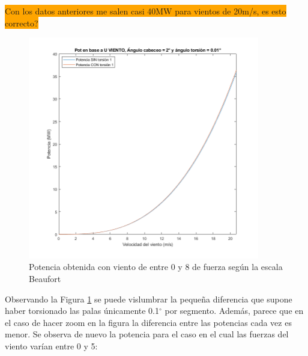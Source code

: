 \colorbox{orange}{Con los datos anteriores me salen casi 40MW para vientos de 20m/s, es esto correcto?}
\begin{figure}[H]
    \centering
    \includegraphics[width=0.9\textwidth]{images/0-8beau torsion.png}
    \caption{Potencia obtenida con viento de entre 0 y 8 de fuerza según la escala Beaufort}
     \label{fig:0-8beaufort_torsion_ejemplo_inicial}
\end{figure}

Observando la Figura \ref{fig:0-8beaufort_torsion_ejemplo_inicial} se puede vislumbrar la pequeña diferencia que supone haber torsionado las palas únicamente 0.1$^{\circ}$ por segmento. Además, parece que en el caso de hacer zoom en la figura la diferencia entre las potencias cada vez es menor. Se observa de nuevo la potencia para el caso en el cual las fuerzas del viento varían entre 0 y 5:

